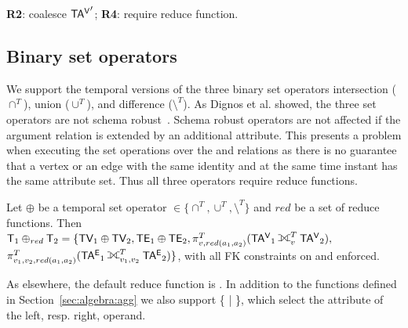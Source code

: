 {\bf R2}: coalesce $\mathsf{TA^{V}}'$; {\bf R4}: require reduce function.


\subsection{Binary set operators}
\label{sec:algebra:binary}

We support the temporal versions of the three binary set operators
intersection ($\cap^T$), union ($\cup^T$), and difference
($\setminus^T$).  As Dignos et al. showed, the three set operators are
not schema robust~\cite{Dignos2012}.  Schema robust operators are not
affected if the argument relation is extended by an additional
attribute.  This presents a problem when executing the set operations
over the \tav and \tae relations as there is no guarantee that a
vertex or an edge with the same identity and at the same time instant
has the same attribute set.  Thus all three operators require reduce
functions.

Let $\oplus$ be a temporal set operator $\in \{ \cap^T, \cup^T,
\setminus^T \}$ and $red$ be a set of reduce functions.  Then $\tve_1
\oplus_{red} \tve_2 = \{ \tv_1 \oplus \tv_2, \te_1 \oplus \te_2,
\pi^T_{v,red(a_1,a_2)}(\tav_1 \fullouterjoin^T_{v}
\tav_2),$\\ $\pi^T_{v_1,v_2,red(a_1,a_2)}(\tae_1
\fullouterjoin^T_{v_1,v_2} \tae_2) \}$, with all FK constraints on
\tav and \tae enforced.

As elsewhere, the default reduce function is .  In addition
to the functions defined in Section~\ref{sec:algebra:agg} we also
support \{  |  \}, which select the attribute
of the left, resp. right, operand.


